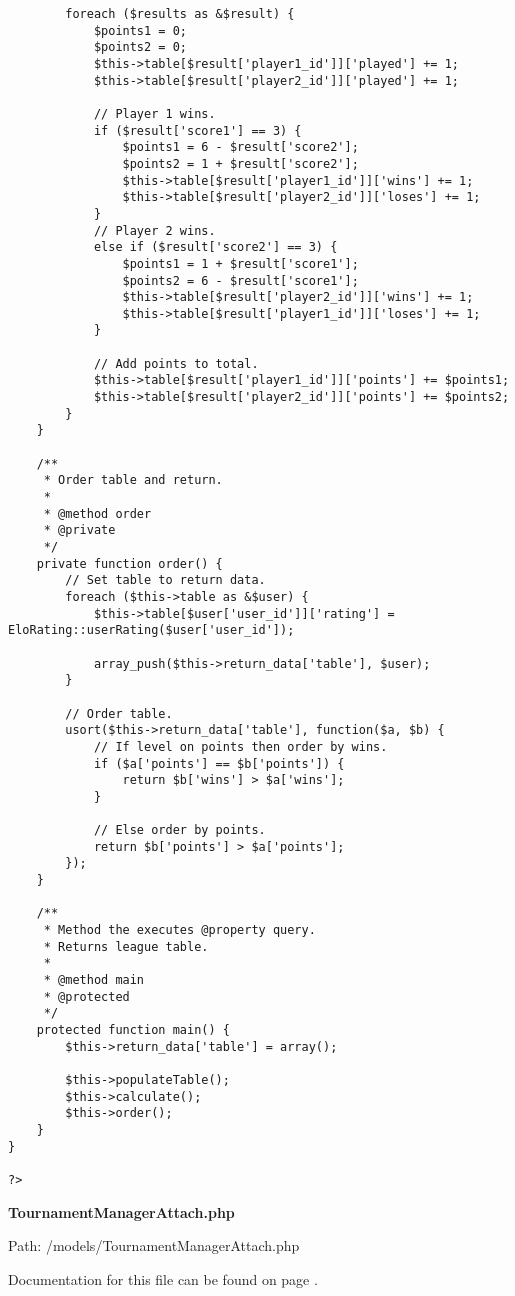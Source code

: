 {\begin{lstlisting}
		foreach ($results as &$result) {
			$points1 = 0;
			$points2 = 0;
			$this->table[$result['player1_id']]['played'] += 1;
			$this->table[$result['player2_id']]['played'] += 1;

			// Player 1 wins.
			if ($result['score1'] == 3) {
				$points1 = 6 - $result['score2'];
				$points2 = 1 + $result['score2'];
				$this->table[$result['player1_id']]['wins'] += 1;
				$this->table[$result['player2_id']]['loses'] += 1;
			}
			// Player 2 wins.
			else if ($result['score2'] == 3) {
				$points1 = 1 + $result['score1'];
				$points2 = 6 - $result['score1'];
				$this->table[$result['player2_id']]['wins'] += 1;
				$this->table[$result['player1_id']]['loses'] += 1;
			}

			// Add points to total.
			$this->table[$result['player1_id']]['points'] += $points1;
			$this->table[$result['player2_id']]['points'] += $points2;
		}
	}

	/**
	 * Order table and return.
	 *
	 * @method order
	 * @private
	 */
	private function order() {
		// Set table to return data.
		foreach ($this->table as &$user) {
			$this->table[$user['user_id']]['rating'] = EloRating::userRating($user['user_id']);

			array_push($this->return_data['table'], $user);
		}

		// Order table.
		usort($this->return_data['table'], function($a, $b) {
			// If level on points then order by wins.
			if ($a['points'] == $b['points']) {
				return $b['wins'] > $a['wins'];
			}

			// Else order by points.
			return $b['points'] > $a['points'];
		});
	}

	/**
	 * Method the executes @property query.
	 * Returns league table.
	 *
	 * @method main
	 * @protected
	 */
	protected function main() {
		$this->return_data['table'] = array();

		$this->populateTable();
		$this->calculate();
		$this->order();		
	}
}

?>\end{lstlisting}
}
\textbf{TournamentManagerAttach.php}\label{TournamentManagerAttach.php}

Path: /models/TournamentManagerAttach.php

Documentation for this file can be found on page \pageref{TournamentManagerAttach.php.doc}.

